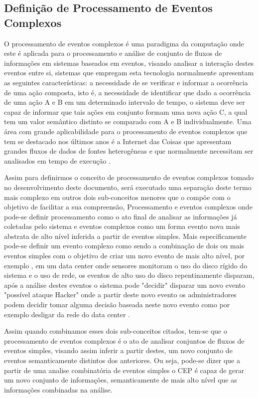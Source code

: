 \documentclass[tid,table]{texufpel} %
\begin{document}
\subsection{Definição de Processamento de Eventos Complexos}
O processamento de eventos complexos é uma paradigma da computação onde este é aplicada para o processamento e análise de conjunto de fluxos de informações em sistemas baseados em eventos, visando analisar a interação destes eventos entre si, sistemas que empregam esta tecnologia normalmente apresentam as seguintes características: a necessidade de se verificar e informar a ocorrência de uma ação composta, isto é, a necessidade de identificar que dado a ocorrência de uma ação A e B em um determinado intervalo de tempo, o sistema deve ser capaz de informar que tais ações em conjunto formam uma nova ação C, a qual tem um valor semântico distinto se comparado com A e B individualmente. Uma área com grande aplicabilidade para o processamento de eventos complexos que tem se destacado nos últimos anos é a Internet das Coisas que apresentam grandes fluxos de dados de fontes heterogêneas e que normalmente necessitam ser analisados em tempo de execução \cite{jun2014design}. 

Assim para definirmos o conceito de processamento de eventos complexos tomado no desenvolvimento deste documento, será executado uma separação deste termo mais complexo em outros dois sub-conceitos menores que o compõe com o objetivo de facilitar a sua compreensão, Processamento e eventos complexos onde pode-se definir processamento como o ato final de analisar as informações já coletadas pelo sistema e eventos complexos como um forma evento nova mais abstrata de alto nível inferida a partir de eventos simples. Mais especificamente pode-se definir um evento complexo como sendo a combinação de dois ou mais eventos simples com o objetivo de criar um novo evento de mais alto nível, por exemplo \cite{dayarathna2018recent}, em um data center onde sensores monitoram o uso do disco rígido do sistema e o uso de rede, os eventos de alto uso do disco repentinamente disparam, após a análise destes eventos o sistema pode "decidir" disparar um novo evento "possível ataque Hacker" onde a partir deste novo evento os administradores podem decidir tomar alguma decisão  baseada neste novo evento como por exemplo desligar da rede do data center \cite{wu2006high}. 

Assim quando combinamos esses dois sub-conceitos citados, tem-se que o processamento de eventos complexos é o ato de analisar conjuntos de fluxos de eventos simples, visando assim inferir a partir destes, um novo conjunto de eventos semanticamente distintos dos anteriores. Ou seja, pode-se dizer que a partir de uma analise combinatória de eventos simples o CEP é capaz de gerar um novo conjunto de informações, semanticamente de mais alto nível que as informações combinadas na análise.
\end{document}
